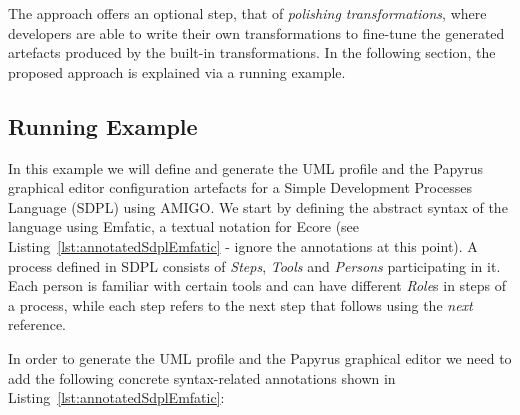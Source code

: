 The approach offers an optional step, that of \textit{polishing transformations}, where developers are able to write their own transformations to fine-tune the generated artefacts produced by the built-in transformations. In the following section, the proposed approach is explained via a running example.

\subsection{Running Example}
\label{sec:example}
In this example we will define and generate the UML profile and the Papyrus 
graphical editor configuration artefacts for a Simple Development Processes 
Language (SDPL) using AMIGO. We start by defining the abstract syntax of the language using 
Emfatic, a textual notation for Ecore (see 
Listing~\ref{lst:annotatedSdplEmfatic} - ignore the annotations at this point). 
A process defined in SDPL consists of \textit{Steps}, 
\textit{Tools} and \textit{Persons} participating in it. Each person is 
familiar with certain tools and can have different \textit{Role}s in steps of a 
process, while each step refers to the next step that follows using the 
\textit{next} reference.

In order to generate the UML profile and the Papyrus graphical editor we need 
to add the following concrete syntax-related annotations shown in 
Listing~\ref{lst:annotatedSdplEmfatic}:

\begin{figure}[t]
	
	
	\vspace*{-5mm}
\end{figure}


